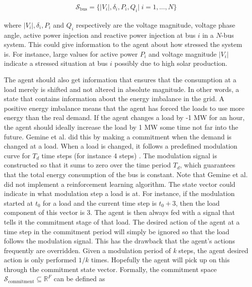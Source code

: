 \documentclass[class=book, crop=false, 11pt]{standalone}
\begin{document}
\begin{equation}
   \begin{aligned}
   \label{eq:problem:bus_state}
\mathcal{S}_{\textrm{bus}} = \{|V_{i}|, \delta_{i}, P_{i}, Q_{i} |\; i = 1,...,N\}
    \end{aligned} 
\end{equation}

where $|V_{i}|,\delta_{i}, P_{i}$ and $Q_{i}$ respectively are the voltage magnitude, voltage phase angle, active power injection and reactive power injection at bus $i$ in a $N$-bus system. This could give information to the agent about how stressed the system is. For instance, large values for active power $P_{i}$ and voltage magnitude $|V_{i}|$ indicate a stressed situation at bus $i$ possibly due to high solar production. 



The agent should also get information that ensures that the consumption at a load merely is shifted and not altered in absolute magnitude. In other words, a state that contains information about the energy imbalance in the grid. A positive energy imbalance means that the agent has forced the loads to use more energy than the real demand. If the agent changes a load by -1 MW for an hour, the agent should ideally increase the load by 1 MW some time not far into the future. Gemine et al. did this by making a commitment when the demand is changed at a load. When a load is changed, it follows a predefined modulation curve for $T_{d}$ time steps (for instance 4 steps) \cite{active_network_management}. The modulation signal is constructed so that it sums to zero over the time period $T_{d}$, which guarantees that the total energy consumption of the bus is constant. Note that Gemine et al. did not implement a reinforcement learning algorithm. The state vector could indicate in what modulation step a load is at. For instance, if the modulation started at $t_{0}$ for a load and the current time step is $t_{0} + 3$, then the load component of this vector is 3. The agent is then always fed with a signal that tells it the commitment stage of that load. The desired action of the agent at a time step in the commitment period will simply be ignored so that the load follows the modulation signal. This has the drawback that the agent's actions frequently are overridden. Given a modulation period of \textit{k} steps, the agent desired action is only performed $1/k$ times. Hopefully the agent will pick up on this through the commitment state vector. Formally, the commitment space $\mathcal{S}_{\textrm{commitment}} \subseteq \mathbb{R}^{F}$ can be defined as
\end{document}
